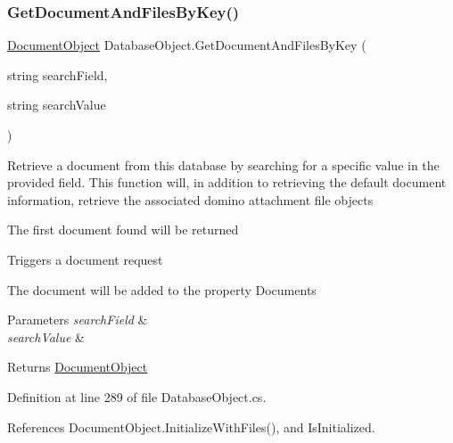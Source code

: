 \subsubsection{\texorpdfstring{Get\+Document\+And\+Files\+By\+Key()}{GetDocumentAndFilesByKey()}}
{\footnotesize\ttfamily \mbox{\hyperlink{class_document_object}{Document\+Object}} Database\+Object.\+Get\+Document\+And\+Files\+By\+Key (\begin{DoxyParamCaption}\item[{string}]{search\+Field,  }\item[{string}]{search\+Value }\end{DoxyParamCaption})}



Retrieve a document from this database by searching for a specific value in the provided field. This function will, in addition to retrieving the default document information, retrieve the associated domino attachment file objects 

The first document found will be returned

Triggers a document request

The document will be added to the property \textquotesingle{}Documents\textquotesingle{}


\begin{DoxyParams}{Parameters}
{\em search\+Field} & \\
\hline
{\em search\+Value} & \\
\hline
\end{DoxyParams}
\begin{DoxyReturn}{Returns}
\mbox{\hyperlink{class_document_object}{Document\+Object}}
\end{DoxyReturn}


Definition at line 289 of file Database\+Object.\+cs.



References Document\+Object.\+Initialize\+With\+Files(), and Is\+Initialized.


